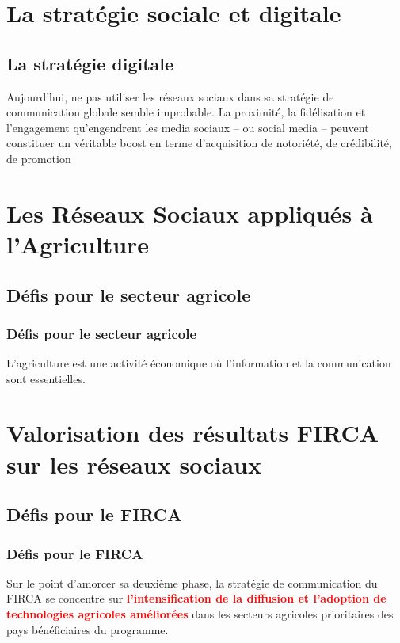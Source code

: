\documentclass{beamer}
\begin{document}
\section{La stratégie sociale et digitale}
\subsection{La stratégie digitale}
\begin{frame}
Aujourd’hui, ne pas utiliser les réseaux sociaux dans sa stratégie de communication globale semble improbable. La proximité, la fidélisation et l’engagement qu’engendrent les media sociaux – ou social media – peuvent constituer un véritable boost en terme d’acquisition de notoriété, de crédibilité, de promotion 
\end{frame}

\section{Les Réseaux Sociaux appliqués à l'Agriculture}
\subsection{Défis pour le secteur agricole}
\begin{frame}
\frametitle{Défis pour le secteur agricole}
L’agriculture est une activité économique où l’information et la communication sont essentielles. 
\end{frame}

\section{Valorisation des résultats FIRCA sur les réseaux sociaux}
\subsection{Défis pour le FIRCA}
\begin{frame}
\frametitle{Défis pour le FIRCA}
Sur le point d'amorcer sa deuxième phase, la stratégie de communication du FIRCA se concentre sur \textcolor{red}{\textbf{l’intensification de la diffusion et l'adoption de technologies agricoles améliorées}} dans les secteurs agricoles prioritaires des pays bénéficiaires du programme.
\end{frame}
\end{document}
